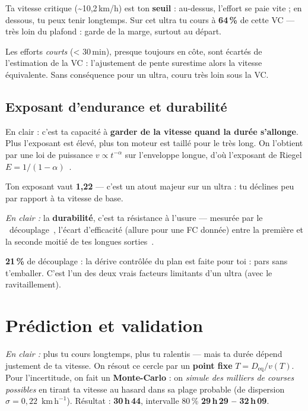\documentclass{locomotionreport}
\newcommand{\Deq}{D_{\mathrm{eq}}}
\begin{document}
\begin{llnote}
Ta vitesse critique (\textasciitilde{}10,2\,km/h) est ton \textbf{seuil} : au-dessus, l'effort se paie vite ; en dessous, tu peux tenir longtemps. Sur cet ultra tu cours \`a \textbf{64\,\%} de cette VC — tr\`es loin du plafond : garde de la marge, surtout au d\'epart.
\end{llnote}

\begin{llattention}
Les efforts \emph{courts} (< 30\,min), presque toujours en c\^ote, sont \'ecart\'es de l'estimation de
la VC : l'ajustement de pente surestime alors la vitesse \'equivalente. Sans cons\'equence pour un ultra,
couru tr\`es loin sous la VC.
\end{llattention}

\subsection{Exposant d'endurance et durabilit\'e}
En clair : c'est ta capacit\'e \`a \textbf{garder de la vitesse quand la dur\'ee s'allonge}. Plus l'exposant est \'elev\'e, plus ton moteur est taill\'e pour le tr\`es long. On l'obtient par une loi de puissance \(v \propto t^{-\alpha}\) sur l'enveloppe
longue, d'o\`u l'exposant de Riegel \(E = 1/(1-\alpha)\)~\cite{riegel1981,drake2024}.
\begin{llnote}
Ton exposant vaut \textbf{1,22} — c'est un atout majeur sur un ultra : tu d\'eclines peu par rapport \`a ta vitesse de base.
\end{llnote}

\emph{En clair :} la \textbf{durabilit\'e}, c'est ta r\'esistance \`a l'usure --- mesur\'ee par le
\og~d\'ecouplage~\fg, l'\'ecart d'efficacit\'e (allure pour une FC donn\'ee) entre la premi\`ere et la
seconde moiti\'e de tes longues sorties~\cite{maunder2021,jones2024}.
\begin{llnote}
\textbf{21\,\%} de d\'ecouplage : la d\'erive contr\^ol\'ee du plan est faite pour toi : pars sans t'emballer. C'est l'un des deux vrais facteurs limitants d'un ultra (avec le ravitaillement).
\end{llnote}

\section{Pr\'ediction et validation}\label{sec:pred}
\emph{En clair :} plus tu cours longtemps, plus tu ralentis --- mais ta dur\'ee d\'epend justement de ta
vitesse. On r\'esout ce cercle par un \textbf{point fixe} \(T = \Deq / v(T)\). Pour l'incertitude, on fait
un \textbf{Monte-Carlo} : on \emph{simule des milliers de courses possibles} en tirant ta vitesse au hasard
dans sa plage probable (de dispersion \(\sigma = 0,22\)~\(\mathrm{km\,h^{-1}}\)). R\'esultat :
\textbf{30\,h\,44}, intervalle 80\,\% \textbf{29\,h\,29 -- 32\,h\,09}.
\end{document}
